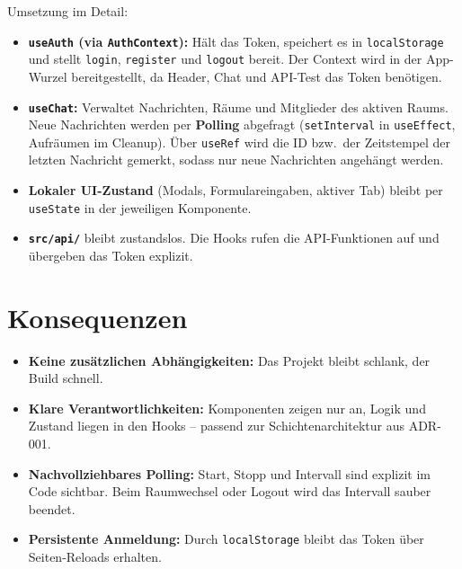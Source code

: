 \documentclass[a4paper,11pt]{article}
\newcommand{\code}[1]{\colorbox{codebg}{\texttt{\small #1}}}
\begin{document}
Umsetzung im Detail:
\begin{itemize}
    \item \textbf{\code{useAuth} (via \code{AuthContext}):} Hält das
          Token, speichert es in \code{localStorage} und stellt
          \code{login}, \code{register} und \code{logout} bereit. Der
          Context wird in der App-Wurzel bereitgestellt, da Header, Chat und
          API-Test das Token benötigen.
    \item \textbf{\code{useChat}:} Verwaltet Nachrichten, Räume und
          Mitglieder des aktiven Raums. Neue Nachrichten werden per
          \textbf{Polling} abgefragt (\code{setInterval} in
          \code{useEffect}, Aufräumen im Cleanup). Über \code{useRef}
          wird die ID bzw.\ der Zeitstempel der letzten Nachricht gemerkt,
          sodass nur neue Nachrichten angehängt werden.
    \item \textbf{Lokaler UI-Zustand} (Modals, Formulareingaben, aktiver Tab)
          bleibt per \code{useState} in der jeweiligen Komponente.
    \item \textbf{\code{src/api/}} bleibt zustandslos. Die Hooks rufen die
          API-Funktionen auf und übergeben das Token explizit.
\end{itemize}

\section{Konsequenzen}
\begin{proBox}
\begin{itemize}[leftmargin=*]
    \item \textbf{Keine zusätzlichen Abhängigkeiten:} Das Projekt bleibt
          schlank, der Build schnell.
    \item \textbf{Klare Verantwortlichkeiten:} Komponenten zeigen nur an,
          Logik und Zustand liegen in den Hooks -- passend zur
          Schichtenarchitektur aus ADR-001.
    \item \textbf{Nachvollziehbares Polling:} Start, Stopp und Intervall sind
          explizit im Code sichtbar. Beim Raumwechsel oder Logout wird das
          Intervall sauber beendet.
    \item \textbf{Persistente Anmeldung:} Durch \code{localStorage} bleibt
          das Token über Seiten-Reloads erhalten.
\end{itemize}
\end{proBox}
\end{document}
